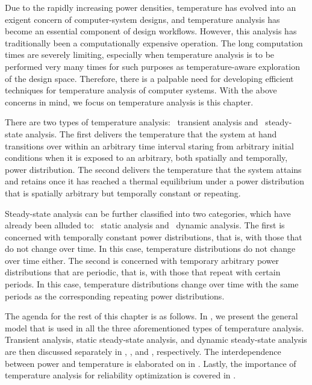 Due to the rapidly increasing power densities, temperature has evolved into an
exigent concern of computer-system designs, and temperature analysis has become
an essential component of design workflows. However, this analysis has
traditionally been a computationally expensive operation. The long computation
times are severely limiting, especially when temperature analysis is to be
performed very many times for such purposes as temperature-aware exploration of
the design space. Therefore, there is a palpable need for developing efficient
techniques for temperature analysis of computer systems. With the above concerns
in mind, we focus on temperature analysis is this chapter.

There are two types of temperature analysis: \one~transient analysis and
\two~steady-state analysis. The first delivers the temperature that the system
at hand transitions over within an arbitrary time interval staring from
arbitrary initial conditions when it is exposed to an arbitrary, both spatially
and temporally, power distribution. The second delivers the temperature that the
system attains and retains once it has reached a thermal equilibrium under a
power distribution that is spatially arbitrary but temporally constant or
repeating.

Steady-state analysis can be further classified into two categories, which have
already been alluded to: \one~static analysis and \two~dynamic analysis. The
first is concerned with temporally constant power distributions, that is, with
those that do not change over time. In this case, temperature distributions do
not change over time either. The second is concerned with temporary arbitrary
power distributions that are periodic, that is, with those that repeat with
certain periods. In this case, temperature distributions change over time with
the same periods as the corresponding repeating power distributions.

The agenda for the rest of this chapter is as follows. In
, we present the general model that is used in all the
three aforementioned types of temperature analysis. Transient analysis, static
steady-state analysis, and dynamic steady-state analysis are then discussed
separately in , ,
and , respectively. The interdependence
between power and temperature is elaborated on in . Lastly,
the importance of temperature analysis for reliability optimization is covered
in .
